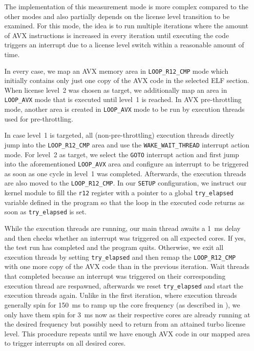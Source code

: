 The implementation of this measurement mode is more complex compared to the other modes and also partially depends on the license level transition to be examined. For this mode, the idea is to run multiple iterations where the amount of \gls{AVX} instructions is increased in every iteration until executing the code triggers an interrupt due to a license level switch within a reasonable amount of time.

In every case, we map an \gls{AVX} memory area in \texttt{LOOP\_R12\_CMP} mode which initially contains only just one copy of the \gls{AVX} code in the selected \gls{ELF} section. When license level~2 was chosen as target, we additionally map an area in \texttt{LOOP\_AVX} mode that is executed until level~1 is reached. In \gls{AVX} pre-throttling mode, another area is created in \texttt{LOOP\_AVX} mode to be run by execution threads used for pre-throttling.

In case level~1 is targeted, all (non-pre-throttling) execution threads directly jump into the \texttt{LOOP\_R12\_CMP} area and use the \texttt{WAKE\_WAIT\_THREAD} interrupt action mode. For level~2 as target, we select the \texttt{GOTO} interrupt action and first jump into the aforementioned \texttt{LOOP\_AVX} area and configure an interrupt to be triggered as soon as one cycle in level~1 was completed. Afterwards, the execution threads are also moved to the \texttt{LOOP\_R12\_CMP}. In our \texttt{SETUP} configuration, we instruct our kernel module to fill the \texttt{r12} register with a pointer to a global \texttt{try\_elapsed} variable defined in the program so that the loop in the executed code returns as soon as \texttt{try\_elapsed} is set.

While the execution threads are running, our main thread awaits a \SI{1}{\milli\second} delay and then checks whether an interrupt was triggered on all expected cores. If yes, the test run has completed and the program quits. Otherwise, we exit all execution threads by setting \texttt{try\_elapsed} and then remap the \texttt{LOOP\_R12\_CMP} with one more copy of the \gls{AVX} code than in the previous iteration. Wait threads that completed because an interrupt was triggered on their corresponding execution thread are respawned, afterwards we reset \texttt{try\_elapsed} and start the execution threads again. Unlike in the first iteration, where execution threads generally spin for \SI{150}{\milli\second} to ramp up the core frequency (as described in ), we only have them spin for \SI{3}{\milli\second} now as their respective cores are already running at the desired frequency but possibly need to return from an attained turbo license level. This procedure repeats until we have enough \gls{AVX} code in our mapped area to trigger interrupts on all desired cores.

